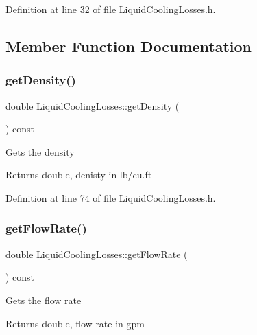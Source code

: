 Definition at line 32 of file Liquid\+Cooling\+Losses.\+h.



\subsection{Member Function Documentation}
\mbox{\label{class_liquid_cooling_losses_ab2a34915eeba8bcea46d67a72cbe17d2}} 
\subsubsection{\texorpdfstring{get\+Density()}{getDensity()}}
{\footnotesize\ttfamily double Liquid\+Cooling\+Losses\+::get\+Density (\begin{DoxyParamCaption}{ }\end{DoxyParamCaption}) const\hspace{0.3cm}{\ttfamily [inline]}}

Gets the density

\begin{DoxyReturn}{Returns}
double, denisty in lb/cu.\+ft 
\end{DoxyReturn}


Definition at line 74 of file Liquid\+Cooling\+Losses.\+h.

\mbox{\label{class_liquid_cooling_losses_acb4a68199bdc5f0597d1feadc3ecdb2c}} 
\subsubsection{\texorpdfstring{get\+Flow\+Rate()}{getFlowRate()}}
{\footnotesize\ttfamily double Liquid\+Cooling\+Losses\+::get\+Flow\+Rate (\begin{DoxyParamCaption}{ }\end{DoxyParamCaption}) const\hspace{0.3cm}{\ttfamily [inline]}}

Gets the flow rate

\begin{DoxyReturn}{Returns}
double, flow rate in gpm 
\end{DoxyReturn}


